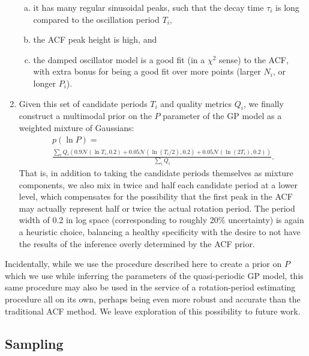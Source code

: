 \documentclass[a4paper,fleqn,usenatbib,useAMS]{mnras}
\begin{document}
\begin{enumerate}
{    \begin{enumerate}[(a)]

    \item{it has many regular sinusoidal peaks, such that the decay
        time $\tau_i$ is long compared to the oscillation period $T_i$,}
    \item{the ACF peak height is high, and}
    \item{the damped oscillator model is a good fit (in a $\chi^2$
      sense) to the ACF, with extra bonus for being
      a good fit over more points (larger $N_i$, or longer $P_i$).}

    \end{enumerate}
}

\item{Given this set of candidate periods $T_i$ and quality metrics $Q_i$,
we finally construct a multimodal prior on the $P$ parameter of the GP
model as a weighted mixture of Gaussians:
\begin{multline}
\label{eq:mixture}
p(\ln P) = \\ \frac {\displaystyle \sum_i Q_i \left(0.9\mathcal N(\ln T_i, 0.2) +
                                          0.05\mathcal N(\ln (T_i/2), 0.2) +
                                          0.05\mathcal N(\ln (2 T_i), 0.2) \right)}
                {\sum_i Q_i}.
\end{multline}
That is, in addition to taking the candidate periods themselves as mixture
components, we also mix in twice and half each candidate period at a lower level,
which compensates for the possibility that the first peak in the ACF may actually
represent half or twice the actual rotation period.  The period width of 0.2 in
log space (corresponding to roughly 20\% uncertainty) is again a heuristic choice,
balancing a healthy specificity with the desire to not have the results of
the inference overly determined by the ACF prior.
}
\end{enumerate}

Incidentally, while we use the procedure described here to create a prior on
$P$ which we use while inferring the parameters of the quasi-periodic GP model,
this same procedure may also be used in the service of a
rotation-period estimating procedure all on its own, perhaps being even more
robust and accurate than the traditional ACF method.  We leave exploration of
this possibility to future work.

\subsection{Sampling}
\label{sec:sampling}
\end{document}
